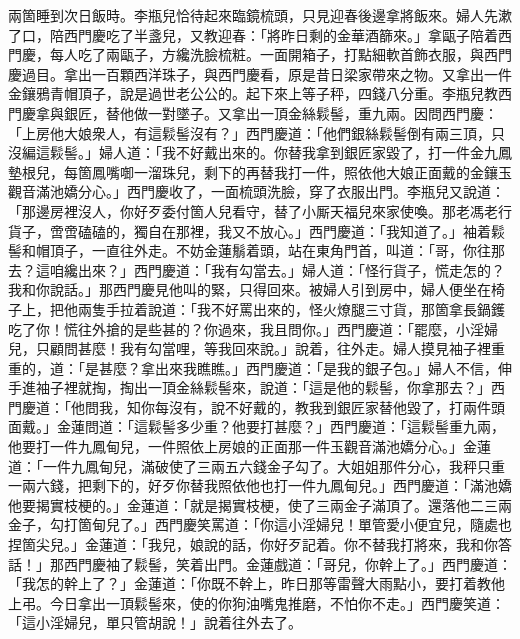兩箇睡到次日飯時。李瓶兒恰待起來臨鏡梳頭，只見迎春後邊拿將飯來。婦人先漱了口，陪西門慶吃了半盞兒，又教迎春：「將昨日剩的金華酒篩來。」拿甌子陪着西門慶，每人吃了兩甌子，方纔洗臉梳粧。一面開箱子，打點細軟首飾衣服，與西門慶過目。拿出一百顆西洋珠子，{}與西門慶看，原是昔日梁家帶來之物。又拿出一件金鑲鴉青帽頂子，說是過世老公公的。起下來上等子秤，四錢八分重。李瓶兒教西門慶拿與銀匠，替他做一對墜子。又拿出一頂金絲鬏髻，重九兩。因問西門慶：「上房他大娘衆人，有這鬏髻沒有？」西門慶道：「他們銀絲鬏髻倒有兩三頂，只沒編這鬏髻。」{}婦人道：「我不好戴出來的。你替我拿到銀匠家毀了，打一件金九鳳墊根兒，每箇鳳嘴啣一溜珠兒，剩下的再替我打一件，照依他大娘正面戴的金鑲玉觀音滿池嬌分心。」西門慶收了，一面梳頭洗臉，穿了衣服出門。李瓶兒又說道：「那邊房裡沒人，你好歹委付箇人兒看守，替了小厮天福兒來家使喚。那老馮老行貨子，啻啻磕磕的，獨自在那裡，我又不放心。」西門慶道：「我知道了。」袖着鬏髻和帽頂子，一直往外走。不妨金蓮鬅着頭，站在東角門首，{}叫道：「哥，你往那去？這咱纔出來？」{}西門慶道：「我有勾當去。」婦人道：「怪行貨子，慌走怎的？我和你說話。」那西門慶見他叫的緊，只得回來。被婦人引到房中，婦人便坐在椅子上，把他兩隻手拉着說道：「我不好罵出來的，怪火燎腿三寸貨，那箇拿長鍋鑊吃了你！慌往外搶的是些甚的？你過來，我且問你。」西門慶道：「罷麼，小淫婦兒，只顧問甚麼！我有勾當哩，等我回來說。」說着，往外走。婦人摸見袖子裡重重的，{}道：「是甚麼？拿出來我瞧瞧。」西門慶道：「是我的銀子包。」{}婦人不信，伸手進袖子裡就掏，掏出一頂金絲鬏髻來，說道：「這是他的鬏髻，{}你拿那去？」西門慶道：「他問我，知你每沒有，說不好戴的，教我到銀匠家替他毀了，打兩件頭面戴。」金蓮問道：「這鬏髻多少重？他要打甚麼？」西門慶道：「這鬏髻重九兩，他要打一件九鳳甸兒，一件照依上房娘的正面那一件玉觀音滿池嬌分心。」金蓮道：「一件九鳳甸兒，滿破使了三兩五六錢金子勾了。{}大姐姐那件分心，我秤只重一兩六錢，{}把剩下的，好歹你替我照依他也打一件九鳳甸兒。」西門慶道：「滿池嬌他要揭實枝梗的。」金蓮道：「就是揭實枝梗，使了三兩金子滿頂了。還落他二三兩金子，{}勾打箇甸兒了。」西門慶笑罵道：「你這小淫婦兒！單管愛小便宜兒，隨處也捏箇尖兒。」金蓮道：「我兒，娘說的話，你好歹記着。你不替我打將來，我和你答話！」那西門慶袖了鬏髻，笑着出門。金蓮戲道：「哥兒，你幹上了。」西門慶道：「我怎的幹上了？」金蓮道：「你既不幹上，昨日那等雷聲大雨點小，要打着教他上弔。今日拿出一頂鬏髻來，使的你狗油嘴鬼推磨，不怕你不走。」{}西門慶笑道：「這小淫婦兒，單只管胡說！」說着往外去了。

